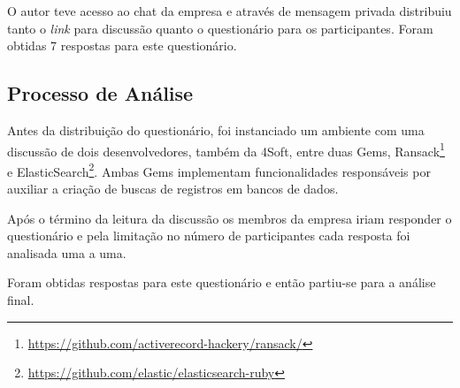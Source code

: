 O autor teve acesso ao chat da empresa e através de mensagem privada distribuiu tanto o \textit{link} para discussão quanto o questionário para os participantes. Foram obtidas 7 respostas para este questionário.

\subsection{Processo de Análise}

Antes da distribuição do questionário, foi instanciado um ambiente com uma discussão de dois desenvolvedores, também da 4Soft, entre duas Gems, Ransack\footnote{\url{https://github.com/activerecord-hackery/ransack/}} e ElasticSearch\footnote{\url{https://github.com/elastic/elasticsearch-ruby}}. Ambas Gems implementam funcionalidades responsáveis por auxiliar a criação de buscas de registros em bancos de dados.

Após o término da leitura da discussão os membros da empresa iriam responder o questionário e pela limitação no número de participantes cada resposta foi analisada uma a uma.

Foram obtidas respostas para este questionário e então partiu-se para a análise final.
